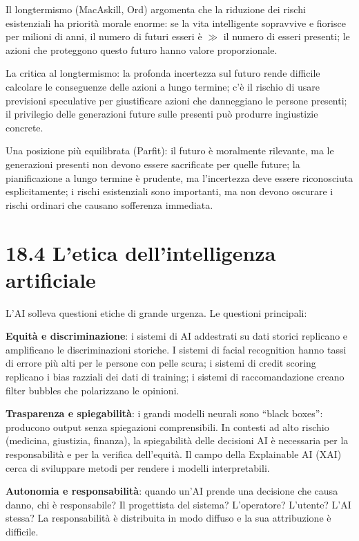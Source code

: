 \documentclass[11.5pt,a4paper,openany]{book}
\theoremstyle{remark}
\begin{document}
Il longtermismo (MacAskill, Ord) argomenta che la riduzione dei rischi esistenziali ha priorità morale enorme: se la vita intelligente sopravvive e fiorisce per milioni di anni, il numero di futuri esseri è $\gg$ il numero di esseri presenti; le azioni che proteggono questo futuro hanno valore proporzionale.

La critica al longtermismo: la profonda incertezza sul futuro rende difficile calcolare le conseguenze delle azioni a lungo termine; c'è il rischio di usare previsioni speculative per giustificare azioni che danneggiano le persone presenti; il privilegio delle generazioni future sulle presenti può produrre ingiustizie concrete.

Una posizione più equilibrata (Parfit): il futuro è moralmente rilevante, ma le generazioni presenti non devono essere sacrificate per quelle future; la pianificazione a lungo termine è prudente, ma l'incertezza deve essere riconosciuta esplicitamente; i rischi esistenziali sono importanti, ma non devono oscurare i rischi ordinari che causano sofferenza immediata.

\section{18.4 L'etica dell'intelligenza artificiale}

L'AI solleva questioni etiche di grande urgenza. Le questioni principali:

\textbf{Equità e discriminazione}: i sistemi di AI addestrati su dati storici replicano e amplificano le discriminazioni storiche. I sistemi di facial recognition hanno tassi di errore più alti per le persone con pelle scura; i sistemi di credit scoring replicano i bias razziali dei dati di training; i sistemi di raccomandazione creano filter bubbles che polarizzano le opinioni.

\textbf{Trasparenza e spiegabilità}: i grandi modelli neurali sono ``black boxes'': producono output senza spiegazioni comprensibili. In contesti ad alto rischio (medicina, giustizia, finanza), la spiegabilità delle decisioni AI è necessaria per la responsabilità e per la verifica dell'equità. Il campo della Explainable AI (XAI) cerca di sviluppare metodi per rendere i modelli interpretabili.

\textbf{Autonomia e responsabilità}: quando un'AI prende una decisione che causa danno, chi è responsabile? Il progettista del sistema? L'operatore? L'utente? L'AI stessa? La responsabilità è distribuita in modo diffuso e la sua attribuzione è difficile.
\end{document}

